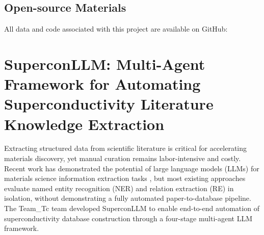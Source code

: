 \subsection*{Open-source Materials}
All data and code associated with this project are available on GitHub: 








\section{SuperconLLM: Multi-Agent Framework for Automating Superconductivity Literature Knowledge Extraction}



Extracting structured data from scientific literature is critical for accelerating materials discovery, yet manual curation remains labor-intensive and costly. Recent work has demonstrated the potential of large language models (LLMs) for materials science information extraction tasks \cite{Foppiano2024}, but most existing approaches evaluate named entity recognition (NER) and relation extraction (RE) in isolation, without demonstrating a fully automated paper-to-database pipeline. The Team\_Tc team developed SuperconLLM to enable end-to-end automation of superconductivity database construction through a four-stage multi-agent LLM framework.

